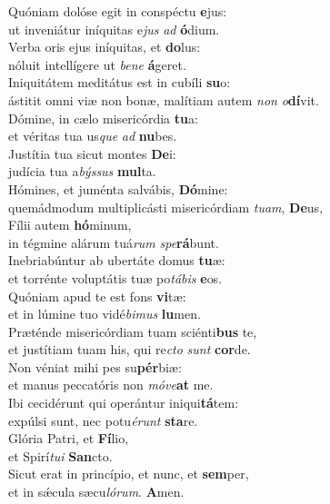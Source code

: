 \evenverse Quóniam dolóse egit in conspéctu \textbf{e}jus:~\*\\
\evenverse ut inveniátur iníquitas e\textit{jus} \textit{ad} \textbf{ó}dium.\\
\oddverse Verba oris ejus iníquitas, et \textbf{do}lus:~\*\\
\oddverse nóluit intellígere ut \textit{be}\textit{ne} \textbf{á}geret.\\
\evenverse Iniquitátem meditátus est in cubíli \textbf{su}o:~\*\\
\evenverse ástitit omni viæ non bonæ, malítiam autem \textit{non} \textit{o}\textbf{dí}vit.\\
\oddverse Dómine, in cælo misericórdia \textbf{tu}a:~\*\\
\oddverse et véritas tua us\textit{que} \textit{ad} \textbf{nu}bes.\\
\evenverse Justítia tua sicut montes \textbf{De}i:~\*\\
\evenverse judícia tua a\textit{býs}\textit{sus} \textbf{mul}ta.\\
\oddverse Hómines, et juménta salvábis, \textbf{Dó}mine:~\*\\
\oddverse quemádmodum multiplicásti misericórdiam \textit{tu}\textit{am}, \textbf{De}us,\\
\evenverse Fílii autem \textbf{hó}minum,~\*\\
\evenverse in tégmine alárum tuá\textit{rum} \textit{spe}\textbf{rá}bunt.\\
\oddverse Inebriabúntur ab ubertáte domus \textbf{tu}æ:~\*\\
\oddverse et torrénte voluptátis tuæ po\textit{tá}\textit{bis} \textbf{e}os.\\
\evenverse Quóniam apud te est fons \textbf{vi}tæ:~\*\\
\evenverse et in lúmine tuo vidé\textit{bi}\textit{mus} \textbf{lu}men.\\
\oddverse Præténde misericórdiam tuam sciénti\textbf{bus} te,~\*\\
\oddverse et justítiam tuam his, qui re\textit{cto} \textit{sunt} \textbf{cor}de.\\
\evenverse Non véniat mihi pes su\textbf{pér}biæ:~\*\\
\evenverse et manus peccatóris non \textit{mó}\textit{ve}\textbf{at} me.\\
\oddverse Ibi cecidérunt qui operántur iniqui\textbf{tá}tem:~\*\\
\oddverse expúlsi sunt, nec potu\textit{é}\textit{runt} \textbf{sta}re.\\
\evenverse Glória Patri, et \textbf{Fí}lio,~\*\\
\evenverse et Spirí\textit{tu}\textit{i} \textbf{San}cto.\\
\oddverse Sicut erat in princípio, et nunc, et \textbf{sem}per,~\*\\
\oddverse et in sǽcula sæcu\textit{ló}\textit{rum}. \textbf{A}men.\\
